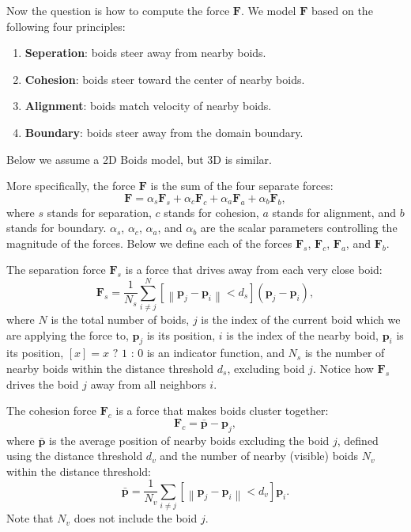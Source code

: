 Now the question is how to compute the force $\mathbf{F}$. We model $\mathbf{F}$ based on the following four principles:
\begin{enumerate}
	\item \textbf{Seperation}: boids steer away from nearby boids.
	\item \textbf{Cohesion}: boids steer toward the center of nearby boids.
	\item \textbf{Alignment}: boids match velocity of nearby boids.
	\item \textbf{Boundary}: boids steer away from the domain boundary.
\end{enumerate}
Below we assume a 2D Boids model, but 3D is similar.

More specifically, the force $\mathbf{F}$ is the sum of the four separate forces:
\begin{equation}
\mathbf{F} = \alpha_s \mathbf{F}_s + \alpha_c \mathbf{F}_c + \alpha_a \mathbf{F}_a + \alpha_b \mathbf{F}_b,
\end{equation}
where $s$ stands for separation, $c$ stands for cohesion, $a$ stands for alignment, and $b$ stands for boundary. $\alpha_s$, $\alpha_c$, $\alpha_a$, and $\alpha_b$ are the scalar parameters controlling the magnitude of the forces. Below we define each of the forces $\mathbf{F}_s$, $\mathbf{F}_c$, $\mathbf{F}_a$, and $\mathbf{F}_b$.

The separation force $\mathbf{F}_s$ is a force that drives away from each very close boid:
\begin{equation}
\mathbf{F}_s = \frac{1}{N_s} \sum_{i \neq j}^N \left[\left\|\mathbf{p}_j - \mathbf{p}_i\right\| < d_s\right] \left(\mathbf{p}_j - \mathbf{p}_i\right),
\end{equation}
where $N$ is the total number of boids, $j$ is the index of the current boid which we are applying the force to, $\mathbf{p}_j$ is its position, $i$ is the index of the nearby boid, $\mathbf{p}_i$ is its position, $[x] = x \text{ ? } 1 \text{ : } 0$ is an indicator function, and $N_s$ is the number of nearby boids within the distance threshold $d_s$, excluding boid $j$. Notice how $\mathbf{F}_s$ drives the boid $j$ away from all neighbors $i$.

The cohesion force $\mathbf{F}_c$ is a force that makes boids cluster together:
\begin{equation}
\mathbf{F}_c = \bar{\mathbf{p}} - \mathbf{p}_j,
\end{equation}
where $\bar{\mathbf{p}}$ is the average position of nearby boids excluding the boid $j$, defined using the distance threshold $d_v$ and the number of nearby (visible) boids $N_v$ within the distance threshold:
\begin{equation}
\bar{\mathbf{p}} = \frac{1}{N_v} \sum_{i \neq j} \left[\left\|\mathbf{p}_j - \mathbf{p}_i\right\| < d_v\right] \mathbf{p}_i.
\end{equation}
Note that $N_v$ does not include the boid $j$.

